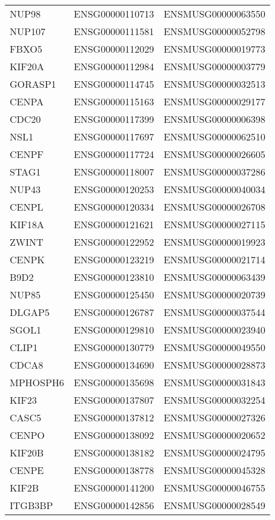 \begin{longtable}{lll}
    NUP98 & ENSG00000110713 & ENSMUSG00000063550 \\
    NUP107 & ENSG00000111581 & ENSMUSG00000052798 \\
    FBXO5 & ENSG00000112029 & ENSMUSG00000019773 \\
    KIF20A & ENSG00000112984 & ENSMUSG00000003779 \\
    GORASP1 & ENSG00000114745 & ENSMUSG00000032513 \\
    CENPA & ENSG00000115163 & ENSMUSG00000029177 \\
    CDC20 & ENSG00000117399 & ENSMUSG00000006398 \\
    NSL1 & ENSG00000117697 & ENSMUSG00000062510 \\
    CENPF & ENSG00000117724 & ENSMUSG00000026605 \\
    STAG1 & ENSG00000118007 & ENSMUSG00000037286 \\
    NUP43 & ENSG00000120253 & ENSMUSG00000040034 \\
    CENPL & ENSG00000120334 & ENSMUSG00000026708 \\
    KIF18A & ENSG00000121621 & ENSMUSG00000027115 \\
    ZWINT & ENSG00000122952 & ENSMUSG00000019923 \\
    CENPK & ENSG00000123219 & ENSMUSG00000021714 \\
    B9D2 & ENSG00000123810 & ENSMUSG00000063439 \\
    NUP85 & ENSG00000125450 & ENSMUSG00000020739 \\
    DLGAP5 & ENSG00000126787 & ENSMUSG00000037544 \\
    SGOL1 & ENSG00000129810 & ENSMUSG00000023940 \\
    CLIP1 & ENSG00000130779 & ENSMUSG00000049550 \\
    CDCA8 & ENSG00000134690 & ENSMUSG00000028873 \\
    MPHOSPH6 & ENSG00000135698 & ENSMUSG00000031843 \\
    KIF23 & ENSG00000137807 & ENSMUSG00000032254 \\
    CASC5 & ENSG00000137812 & ENSMUSG00000027326 \\
    CENPO & ENSG00000138092 & ENSMUSG00000020652 \\
    KIF20B & ENSG00000138182 & ENSMUSG00000024795 \\
    CENPE & ENSG00000138778 & ENSMUSG00000045328 \\
    KIF2B & ENSG00000141200 & ENSMUSG00000046755 \\
    ITGB3BP & ENSG00000142856 & ENSMUSG00000028549 \\

\end{longtable}
